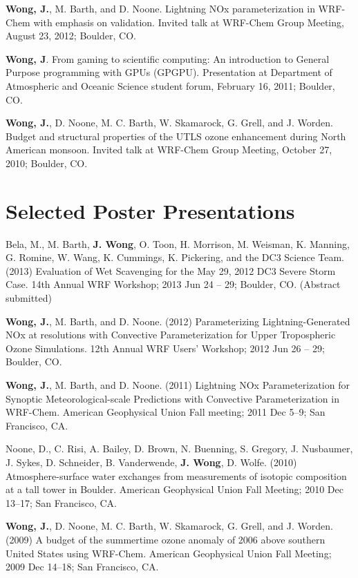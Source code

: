 \documentclass[overlap,12pt,centered]{res}
\begin{document}
\begin{resume}
		\textbf{Wong, J.}, M. Barth, and D. Noone.  Lightning NOx parameterization in WRF-Chem with emphasis on validation.  Invited talk at WRF-Chem Group Meeting, August 23, 2012; Boulder, CO.
		
		\textbf{Wong, J}. From gaming to scientific computing: An introduction to General Purpose programming with GPUs (GPGPU). Presentation at Department of Atmospheric and Oceanic Science student forum, February 16, 2011; Boulder, CO.
		
		\textbf{Wong, J.}, D. Noone, M. C. Barth, W. Skamarock, G. Grell, and J. Worden. Budget and structural properties of the UTLS ozone enhancement during North American monsoon. Invited talk at WRF-Chem Group Meeting, October 27, 2010; Boulder, CO.
		
		
		\section{ \sc Selected Poster Presentations}
		
		Bela, M., M. Barth, \textbf{J. Wong}, O. Toon, H. Morrison, M. Weisman, K. Manning, G. Romine, W. Wang, K. Cummings, K. Pickering, and the DC3 Science Team. (2013) Evaluation of Wet Scavenging for the May 29, 2012 DC3 Severe Storm Case. 14th Annual WRF Workshop; 2013 Jun 24 -- 29; Boulder, CO. (Abstract submitted)
		
		\textbf{Wong, J.}, M. Barth, and D. Noone. (2012) Parameterizing Lightning-Generated NOx at resolutions with Convective Parameterization for Upper Tropospheric Ozone Simulations. 12th Annual WRF Users' Workshop; 2012 Jun 26 -- 29; Boulder, CO.
		
		\textbf{Wong, J.}, M. Barth, and D. Noone. (2011) Lightning NOx Parameterization for Synoptic Meteorological-scale Predictions with Convective Parameterization in WRF-Chem. American Geophysical Union Fall meeting; 2011 Dec 5--9; San Francisco, CA.
		
		Noone, D., C. Risi, A. Bailey, D. Brown, N. Buenning, S. Gregory, J. Nusbaumer, J. Sykes, D. Schneider, B. Vanderwende, \textbf{J. Wong}, D. Wolfe. (2010) Atmosphere-surface water exchanges from measurements of isotopic composition at a tall tower in Boulder. American Geophysical Union Fall Meeting; 2010 Dec 13--17; San Francisco, CA.
		
		\textbf{Wong, J.}, D. Noone, M. C. Barth, W. Skamarock, G. Grell, and J. Worden. (2009) A budget of the summertime ozone anomaly of 2006 above southern United States using WRF-Chem. American Geophysical Union Fall Meeting; 2009 Dec 14--18; San Francisco, CA.
		

\end{resume}
\end{document}
